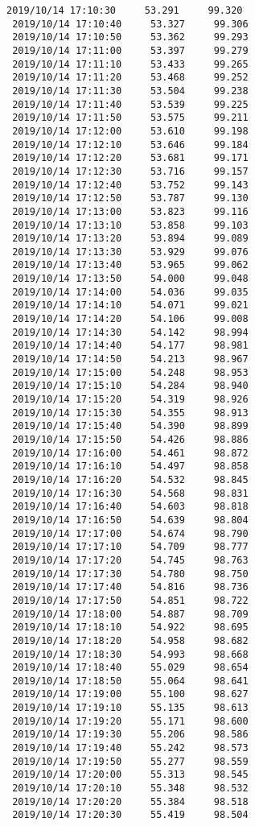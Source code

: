\documentclass[11pt]{article}
\begin{document}
\begin{Verbatim}[commandchars=\\\{\}]
 2019/10/14 17:10:30     53.291     99.320
 2019/10/14 17:10:40     53.327     99.306
 2019/10/14 17:10:50     53.362     99.293
 2019/10/14 17:11:00     53.397     99.279
 2019/10/14 17:11:10     53.433     99.265
 2019/10/14 17:11:20     53.468     99.252
 2019/10/14 17:11:30     53.504     99.238
 2019/10/14 17:11:40     53.539     99.225
 2019/10/14 17:11:50     53.575     99.211
 2019/10/14 17:12:00     53.610     99.198
 2019/10/14 17:12:10     53.646     99.184
 2019/10/14 17:12:20     53.681     99.171
 2019/10/14 17:12:30     53.716     99.157
 2019/10/14 17:12:40     53.752     99.143
 2019/10/14 17:12:50     53.787     99.130
 2019/10/14 17:13:00     53.823     99.116
 2019/10/14 17:13:10     53.858     99.103
 2019/10/14 17:13:20     53.894     99.089
 2019/10/14 17:13:30     53.929     99.076
 2019/10/14 17:13:40     53.965     99.062
 2019/10/14 17:13:50     54.000     99.048
 2019/10/14 17:14:00     54.036     99.035
 2019/10/14 17:14:10     54.071     99.021
 2019/10/14 17:14:20     54.106     99.008
 2019/10/14 17:14:30     54.142     98.994
 2019/10/14 17:14:40     54.177     98.981
 2019/10/14 17:14:50     54.213     98.967
 2019/10/14 17:15:00     54.248     98.953
 2019/10/14 17:15:10     54.284     98.940
 2019/10/14 17:15:20     54.319     98.926
 2019/10/14 17:15:30     54.355     98.913
 2019/10/14 17:15:40     54.390     98.899
 2019/10/14 17:15:50     54.426     98.886
 2019/10/14 17:16:00     54.461     98.872
 2019/10/14 17:16:10     54.497     98.858
 2019/10/14 17:16:20     54.532     98.845
 2019/10/14 17:16:30     54.568     98.831
 2019/10/14 17:16:40     54.603     98.818
 2019/10/14 17:16:50     54.639     98.804
 2019/10/14 17:17:00     54.674     98.790
 2019/10/14 17:17:10     54.709     98.777
 2019/10/14 17:17:20     54.745     98.763
 2019/10/14 17:17:30     54.780     98.750
 2019/10/14 17:17:40     54.816     98.736
 2019/10/14 17:17:50     54.851     98.722
 2019/10/14 17:18:00     54.887     98.709
 2019/10/14 17:18:10     54.922     98.695
 2019/10/14 17:18:20     54.958     98.682
 2019/10/14 17:18:30     54.993     98.668
 2019/10/14 17:18:40     55.029     98.654
 2019/10/14 17:18:50     55.064     98.641
 2019/10/14 17:19:00     55.100     98.627
 2019/10/14 17:19:10     55.135     98.613
 2019/10/14 17:19:20     55.171     98.600
 2019/10/14 17:19:30     55.206     98.586
 2019/10/14 17:19:40     55.242     98.573
 2019/10/14 17:19:50     55.277     98.559
 2019/10/14 17:20:00     55.313     98.545
 2019/10/14 17:20:10     55.348     98.532
 2019/10/14 17:20:20     55.384     98.518
 2019/10/14 17:20:30     55.419     98.504

\end{Verbatim}
\end{document}
